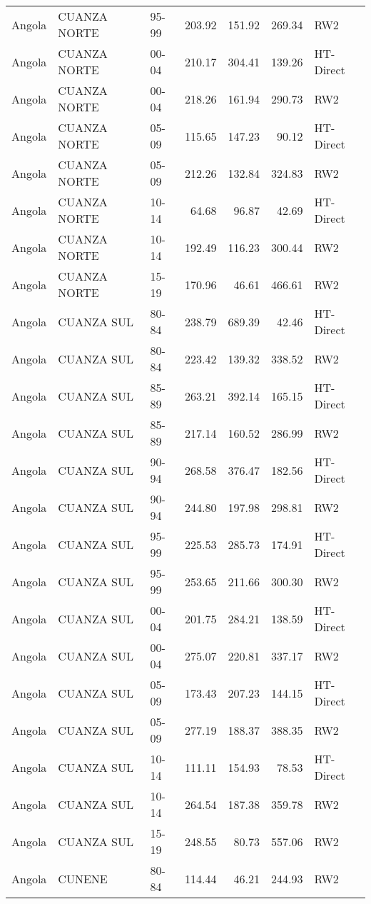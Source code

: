 \begin{longtable}{lllrrrl}
  Angola & CUANZA NORTE & 95-99 & 203.92 & 151.92 & 269.34 & RW2 \\ 
  Angola & CUANZA NORTE & 00-04 & 210.17 & 304.41 & 139.26 & HT-Direct \\ 
  Angola & CUANZA NORTE & 00-04 & 218.26 & 161.94 & 290.73 & RW2 \\ 
  Angola & CUANZA NORTE & 05-09 & 115.65 & 147.23 & 90.12 & HT-Direct \\ 
  Angola & CUANZA NORTE & 05-09 & 212.26 & 132.84 & 324.83 & RW2 \\ 
  Angola & CUANZA NORTE & 10-14 & 64.68 & 96.87 & 42.69 & HT-Direct \\ 
  Angola & CUANZA NORTE & 10-14 & 192.49 & 116.23 & 300.44 & RW2 \\ 
  Angola & CUANZA NORTE & 15-19 & 170.96 & 46.61 & 466.61 & RW2 \\ 
  Angola & CUANZA SUL & 80-84 & 238.79 & 689.39 & 42.46 & HT-Direct \\ 
  Angola & CUANZA SUL & 80-84 & 223.42 & 139.32 & 338.52 & RW2 \\ 
  Angola & CUANZA SUL & 85-89 & 263.21 & 392.14 & 165.15 & HT-Direct \\ 
  Angola & CUANZA SUL & 85-89 & 217.14 & 160.52 & 286.99 & RW2 \\ 
  Angola & CUANZA SUL & 90-94 & 268.58 & 376.47 & 182.56 & HT-Direct \\ 
  Angola & CUANZA SUL & 90-94 & 244.80 & 197.98 & 298.81 & RW2 \\ 
  Angola & CUANZA SUL & 95-99 & 225.53 & 285.73 & 174.91 & HT-Direct \\ 
  Angola & CUANZA SUL & 95-99 & 253.65 & 211.66 & 300.30 & RW2 \\ 
  Angola & CUANZA SUL & 00-04 & 201.75 & 284.21 & 138.59 & HT-Direct \\ 
  Angola & CUANZA SUL & 00-04 & 275.07 & 220.81 & 337.17 & RW2 \\ 
  Angola & CUANZA SUL & 05-09 & 173.43 & 207.23 & 144.15 & HT-Direct \\ 
  Angola & CUANZA SUL & 05-09 & 277.19 & 188.37 & 388.35 & RW2 \\ 
  Angola & CUANZA SUL & 10-14 & 111.11 & 154.93 & 78.53 & HT-Direct \\ 
  Angola & CUANZA SUL & 10-14 & 264.54 & 187.38 & 359.78 & RW2 \\ 
  Angola & CUANZA SUL & 15-19 & 248.55 & 80.73 & 557.06 & RW2 \\ 
  Angola & CUNENE & 80-84 & 114.44 & 46.21 & 244.93 & RW2 \\ 

\end{longtable}
